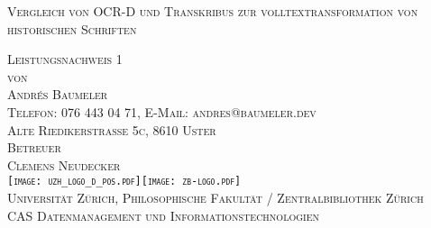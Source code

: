 

\begin{titlepage}

\begin{center}
\Large
\textsc{Vergleich von OCR-D und Transkribus zur volltextransformation von historischen Schriften}\\

\vspace{2cm}

\textsc{Leistungsnachweis 1\\[0.5\baselineskip]
 von\\[0.5\baselineskip]
Andrés Baumeler\\
{\normalsize \textsc{Telefon: 076 443 04 71, E-Mail: andres@baumeler.dev }}\\
{\normalsize \textsc{Alte Riedikerstrasse 5c, 8610 Uster}}}\\


\vspace{3cm}
\textsc{Betreuer\\
Clemens Neudecker}\\

\vspace{2cm}
\textsc{ \texttt{[image: uzh\_logo\_d\_pos.pdf]}\hspace{1cm}\texttt{[image: zb-logo.pdf]} \\
\normalsize{Universität Zürich, Philosophische Fakultät  / Zentralbibliothek Zürich}\\
\normalsize{CAS Datenmanagement und Informationstechnologien}}\\

\end{center}

\end{titlepage}

